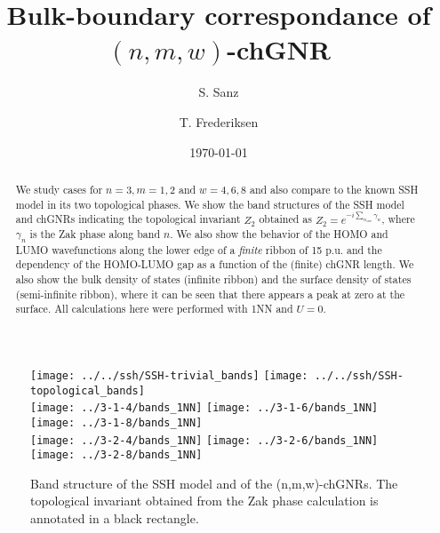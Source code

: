 \documentclass[amsmath,%
amssymb,prb,superscriptaddress]{revtex4}
\begin{document}
\title{Bulk-boundary correspondance of $(n,m,w)$-chGNR}

\author{S. Sanz}

\author{T. Frederiksen}

\date{\today}

\begin{abstract}
We study cases for $n=3, m=1, 2$ and $w=4,6,8$ and also compare to the known SSH model in its two topological phases. We show the band structures of the SSH model and chGNRs indicating the topological invariant $Z_{2}$ obtained as $Z_{2}=e^{-i\sum_{n_{occ}}\gamma_{n}}$, where $\gamma_{n}$ is the Zak phase along band $n$. We also show the behavior of the HOMO and LUMO wavefunctions along the lower edge of a \emph{finite} ribbon of 15 p.u. and the dependency of the HOMO-LUMO gap as a function of the (finite) chGNR length. We also show the bulk density of states (infinite ribbon) and the surface density of states (semi-infinite ribbon), where it can be seen that there appears a peak at zero at the surface. All calculations here were performed with 1NN and $U=0$.
\end{abstract}


\maketitle

%
%

\begin{figure*}
	\texttt{[image: ../../ssh/SSH-trivial\_bands]}
	\texttt{[image: ../../ssh/SSH-topological\_bands]}\\
	\texttt{[image: ../3-1-4/bands\_1NN]}
	\texttt{[image: ../3-1-6/bands\_1NN]}
	\texttt{[image: ../3-1-8/bands\_1NN]}\\
	\texttt{[image: ../3-2-4/bands\_1NN]}
	\texttt{[image: ../3-2-6/bands\_1NN]}
	\texttt{[image: ../3-2-8/bands\_1NN]}
	\caption{Band structure of the SSH model and of the (n,m,w)-chGNRs. The topological invariant obtained from the Zak phase calculation is annotated in a black rectangle. }
\end{figure*}
\end{document}
